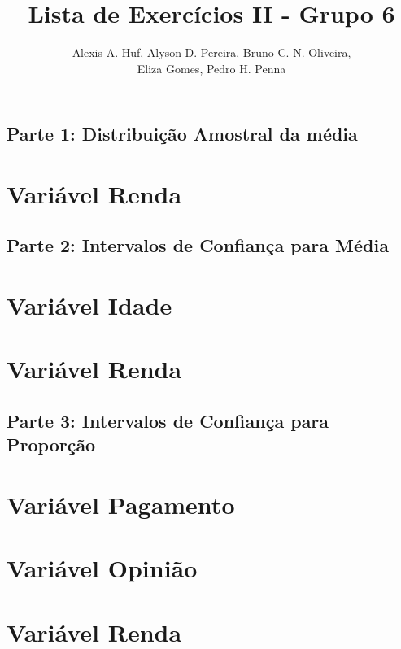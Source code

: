 \documentclass[10pt,a4paper,oneside]{article}
\author{%
	Alexis A. Huf, %
	Alyson D. Pereira, %
	Bruno C. N. Oliveira,\\%
	Eliza Gomes, %
	Pedro H. Penna
	}
\title{Lista de Exercícios II - Grupo 6}
\begin{document}
\maketitle

\begin{center}
	\section*{Parte 1: Distribuição Amostral da média}
\end{center}

\section{Variável Renda}
\label{questao:1}


\begin{center}
	\section*{Parte 2: Intervalos de Confiança para Média}
\end{center}

\section{Variável Idade}
\label{questao:2}


\section{Variável Renda}
\label{questao:3}


\begin{center}
	\section*{Parte 3: Intervalos de Confiança para Proporção}
\end{center}

\section{Variável Pagamento}
\label{questao:4}


\section{Variável Opinião}
\label{questao:5}


\section{Variável Renda}
\label{questao:6}

\end{document}
